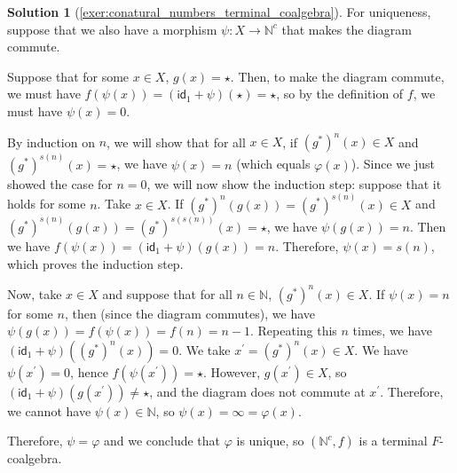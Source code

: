 \documentclass[a4paper,11pt, oneside,titlepage=false]{scrbook}
\theoremstyle{plain}
\theoremstyle{definition}
\newtheorem{solution}[thm]{Solution}
\newcommand{\cfont}[1]{\ensuremath{\mathsf{#1}}}
\newcommand{\Id}[1][]{\cfont{id}_{#1}}
\begin{document}
\begin{solution}[\cref{exer:conatural_numbers_terminal_coalgebra}]
	For uniqueness, suppose that we also have a morphism $ \psi: X \to \mathbb N^c $ that makes the diagram commute.

	Suppose that for some $ x \in X $, $ g(x) = \star $. Then, to make the diagram commute, we must have $ f(\psi(x)) = (\Id[1] + \psi)(\star) = \star $, so by the definition of $ f $, we must have $ \psi(x) = 0 $.

	By induction on $ n $, we will show that for all $ x \in X $, if $ (g^*)^n(x) \in X $ and $ (g^*)^{s(n)}(x) = \star $, we have $ \psi(x) = n $ (which equals $ \varphi(x) $). Since we just showed the case for $ n = 0 $, we will now show the induction step: suppose that it holds for some $ n $. Take $ x \in X $. If $ (g^*)^n(g(x)) = (g^*)^{s(n)}(x) \in X $ and $ (g^*)^{s(n)}(g(x)) = (g^*)^{s(s(n))}(x) = \star $, we have $ \psi(g(x)) = n $. Then we have $ f(\psi(x)) = (\Id[1] + \psi)(g(x)) = n $. Therefore, $ \psi(x) = s(n) $, which proves the induction step.

	Now, take $ x \in X $ and suppose that for all $ n \in \mathbb N $, $ (g^*)^n(x) \in X $. If $ \psi(x) = n $ for some $ n $, then (since the diagram commutes), we have $ \psi(g(x)) = f(\psi(x)) = f(n) = n - 1 $. Repeating this $ n $ times, we have $ (\Id[1] + \psi)((g^*)^n(x)) = 0 $. We take $ x^\prime = (g^*)^n(x) \in X $. We have $ \psi(x^\prime) = 0 $, hence $ f(\psi(x^\prime)) = \star $. However, $ g(x^\prime) \in X $, so $ (\Id[1] + \psi)(g(x^\prime)) \not = \star $, and the diagram does not commute at $x^\prime$. Therefore, we cannot have $ \psi(x) \in \mathbb N $, so $ \psi(x) = \infty = \varphi(x) $.

	Therefore, $ \psi = \varphi $ and we conclude that $ \varphi $ is unique, so $ (\mathbb N^c, f) $ is a terminal $ F $-coalgebra.
\end{solution}
\end{document}
